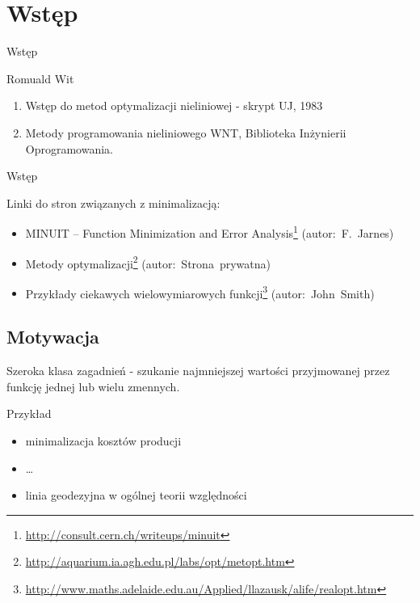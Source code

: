 \section{Wstęp}

  \begin{frame}{Wstęp}
    \begin{block}{Romuald Wit}
      \begin{enumerate}
        \item Wstęp do metod optymalizacji nieliniowej - skrypt
        UJ, 1983
        \item Metody programowania nieliniowego WNT, Biblioteka
        Inżynierii Oprogramowania.
      \end{enumerate}
    \end{block}
  \end{frame}

  \begin{frame}{Wstęp}
    \begin{block}{Linki do stron związanych z minimalizacją:}
      \begin{itemize}
        \item MINUIT -- Function Minimization and Error
        Analysis\footnote{\url{http://consult.cern.ch/writeups/minuit}}
        (autor:~F.~Jarnes)
        \item Metody optymalizacji\footnote{\url{http://aquarium.ia.agh.edu.pl/labs/opt/metopt.htm}}
        (autor:~Strona~prywatna)
        \item Przykłady ciekawych wielowymiarowych
        funkcji\footnote{\url{http://www.maths.adelaide.edu.au/Applied/llazausk/alife/realopt.htm}}
        (autor:~John~Smith)
      \end{itemize}
    \end{block}
  \end{frame}

\subsection{Motywacja}

  \begin{frame}
    \begin{block}{}
      Szeroka klasa zagadnień - szukanie najmniejszej wartości
      przyjmowanej przez funkcję jednej lub wielu zmennych.
    \end{block}

    \begin{exampleblock}{Przykład}
      \begin{itemize}
        \item minimalizacja kosztów producji
        \item \ldots
        \item linia geodezyjna w ogólnej teorii względności
      \end{itemize}
    \end{exampleblock}
  \end{frame}

